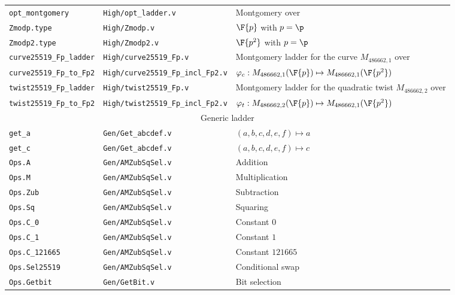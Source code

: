\begin{table*}[h]
\begin{tabular}{ l | l | l }
    \texttt{opt\_montgomery} & \texttt{High/opt\_ladder.v} & Montgomery over \K \\
    \texttt{Zmodp.type} & \texttt{High/Zmodp.v} & $\F{p}$ with $p = \p$ \\
    \texttt{Zmodp2.type} & \texttt{High/Zmodp2.v} & $\F{p^2}$ with $p = \p$ \\
    \texttt{curve25519\_Fp\_ladder} & \texttt{High/curve25519\_Fp.v} & Montgomery ladder for the curve $M_{486662,1}$ over \F{p} \\
    \texttt{curve25519\_Fp\_to\_Fp2} & \texttt{High/curve25519\_Fp\_incl\_Fp2.v} & $\varphi_c: M_{486662,1}(\F{p}) \mapsto M_{486662,1}(\F{p^2})$ \\
    \texttt{twist25519\_Fp\_ladder} & \texttt{High/twist25519\_Fp.v} & Montgomery ladder for the quadratic twist $M_{486662,2}$ over \F{p} \\
    \texttt{twist25519\_Fp\_to\_Fp2} & \texttt{High/twist25519\_Fp\_incl\_Fp2.v} & $\varphi_t: M_{486662,2}(\F{p}) \mapsto M_{486662,1}(\F{p^2})$ \\
    \hline
    \multicolumn{3}{c}{Generic ladder}\\
    \hline
    \texttt{get\_a} & \texttt{Gen/Get\_abcdef.v} & $(a,b,c,d,e,f) \mapsto a$ \\
    \texttt{get\_c} & \texttt{Gen/Get\_abcdef.v} & $(a,b,c,d,e,f) \mapsto c$ \\
    \texttt{Ops.A} & \texttt{Gen/AMZubSqSel.v} & Addition \\
    \texttt{Ops.M} & \texttt{Gen/AMZubSqSel.v} & Multiplication \\
    \texttt{Ops.Zub} & \texttt{Gen/AMZubSqSel.v} & Subtraction \\
    \texttt{Ops.Sq} & \texttt{Gen/AMZubSqSel.v} & Squaring \\
    \texttt{Ops.C\_0} & \texttt{Gen/AMZubSqSel.v} & Constant $0$ \\
    \texttt{Ops.C\_1} & \texttt{Gen/AMZubSqSel.v} & Constant $1$ \\
    \texttt{Ops.C\_121665} & \texttt{Gen/AMZubSqSel.v} & Constant $121665$ \\
    \texttt{Ops.Sel25519} & \texttt{Gen/AMZubSqSel.v} & Conditional swap \\
    \texttt{Ops.Getbit} & \texttt{Gen/GetBit.v} & Bit selection \\

\end{tabular}
\end{table*}
